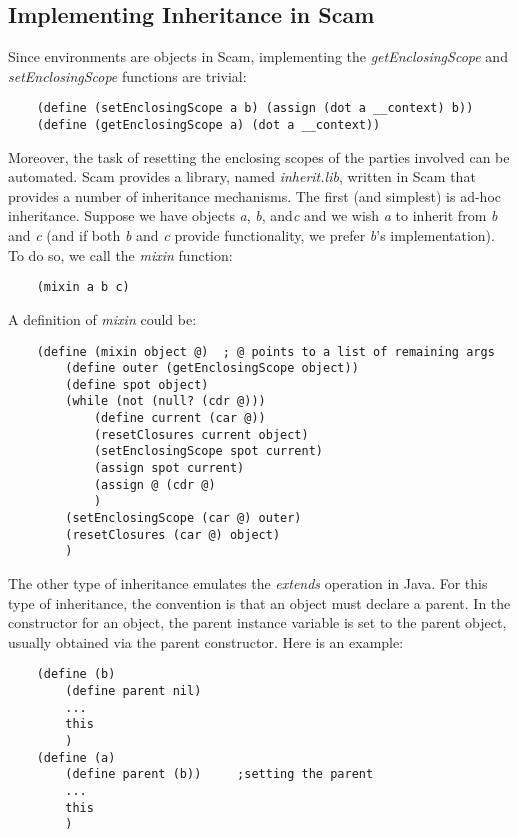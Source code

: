 \subsection{Implementing Inheritance in Scam}

Since environments are objects in Scam, implementing the {\it
getEnclosingScope} and {\it setEnclosingScope} functions are trivial:

\begin{verbatim}
    (define (setEnclosingScope a b) (assign (dot a __context) b))
    (define (getEnclosingScope a) (dot a __context))
\end{verbatim}

Moreover, the task of resetting the enclosing scopes of the parties
involved can be automated. Scam provides a library, 
named {\it inherit.lib}, written in Scam that
provides a number of inheritance mechanisms. The first (and simplest)
is ad-hoc inheritance. Suppose we have objects {\it a}, {\it b}, and{\it  c}
and we wish
{\it a} to inherit from {\it b} and {\it c}
(and if both {\it b} and {\it c} provide functionality,
we prefer {\it b}'s implementation).
To do so, we call the {\it mixin} function:

\begin{verbatim}
    (mixin a b c)
\end{verbatim}

A definition of {\it mixin} could be:

\begin{verbatim}
    (define (mixin object @)  ; @ points to a list of remaining args
        (define outer (getEnclosingScope object))
        (define spot object)
        (while (not (null? (cdr @)))
            (define current (car @))
            (resetClosures current object)
            (setEnclosingScope spot current)
            (assign spot current)
            (assign @ (cdr @)
            )
        (setEnclosingScope (car @) outer)
        (resetClosures (car @) object)
        )
\end{verbatim}

The other type of inheritance emulates the {\it extends} operation in
Java.  For this type of inheritance, the convention is that an object
must declare a parent. In the constructor for an object, the parent
instance variable is set to the parent object, usually obtained via the
parent constructor.  Here is an example:

\begin{verbatim}
    (define (b)
        (define parent nil)
        ...
        this
        )
    (define (a)
        (define parent (b))     ;setting the parent 
        ...
        this
        )
\end{verbatim}

